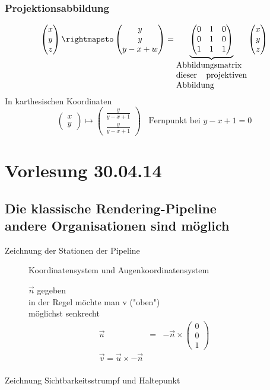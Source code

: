 \documentclass[11pt]{article}
\begin{document}
\subsubsection{Projektionsabbildung}
$$
\begin{pmatrix} x \\ y \\ z \end{pmatrix}
\rightmapsto
\begin{pmatrix} y \\ y \\ y-x+w \end{pmatrix}
=
\underset{\begin{minipage}[c]{3cm}
Abbildungsmatrix dieser projektiven Abbildung
\end{minipage}}{\underbrace{\begin{pmatrix}
0 & 1 & 0 \\
0 & 1 & 0 \\
1 & 1 & 1 \\
\end{pmatrix}}}
\begin{pmatrix} x \\ y \\ z \end{pmatrix}
$$
In karthesischen Koordinaten
$$ 
\begin{pmatrix}
x \\ y
\end{pmatrix}
\mapsto
\begin{pmatrix}
\frac{y}{y-x+1} \\ \frac{y}{y-x+1}
\end{pmatrix}
\; \; \text{ Fernpunkt bei $y-x+1 = 0$}
$$
\section{Vorlesung 30.04.14}
\subsection{Die klassische Rendering-Pipeline\\andere Organisationen sind möglich}
{\color{red} Zeichnung der Stationen der Pipeline}
\FloatBarrier
\begin{figure}[!hb]
\begin{minipage}[c]{5cm}
{\color{red}Koordinatensystem und Augenkoordinatensystem} 
\end{minipage}
\hfill
\begin{minipage}[r]{6cm}
$\vec{n}$ gegeben \\
in der Regel möchte man v ("oben")\\
möglichst senkrecht\\
\begin{eqnarray}
\vec{u} &=& -\vec{n} \times \begin{pmatrix}
0 \\ 0 \\ 1
\end{pmatrix}\\
\vec{v} = \vec{u} \times -\vec{n}\\
\end{eqnarray}
\end{minipage}
\end{figure}
{\color{red} Zeichnung Sichtbarkeitsstrumpf und Haltepunkt}
\end{document}
